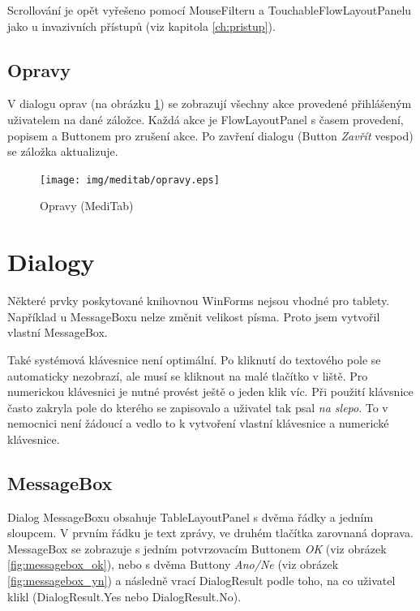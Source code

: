 Scrollování je opět vyřešeno pomocí MouseFilteru a TouchableFlowLayoutPanelu jako u invazivních přístupů (viz kapitola \ref{ch:pristup}).


\subsection{Opravy}

V dialogu oprav (na obrázku \ref{fig:opravy}) se zobrazují všechny akce provedené přihlášeným uživatelem na dané záložce. Každá akce je FlowLayoutPanel s časem provedení, popisem a Buttonem pro zrušení akce. Po zavření dialogu (Button \emph{Zavřít} vespod) se záložka aktualizuje.

\begin{figure}[H]
	\centering
	\texttt{[image: img/meditab/opravy.eps]}
	\caption{Opravy (MediTab)}
  \label{fig:opravy}
\end{figure}



\section{Dialogy}
\label{ch:dialogy}

Některé prvky poskytované knihovnou WinForms nejsou vhodné pro tablety. Například u MessageBoxu nelze změnit velikost písma. Proto jsem vytvořil vlastní MessageBox.

Také systémová klávesnice není optimální. Po kliknutí do textového pole se automaticky nezobrazí, ale musí se kliknout na malé tlačítko v liště. Pro numerickou klávesnici je nutné provést ještě o jeden klik víc. Při použití klávsnice často zakryla pole do kterého se zapisovalo a uživatel tak psal \emph{na slepo}. To v nemocnici není žádoucí a vedlo to k vytvoření vlastní klávesnice a numerické klávesnice.

\subsection{MessageBox}

Dialog MessageBoxu obsahuje TableLayoutPanel s dvěma řádky a jedním sloupcem. V prvním řádku je text zprávy, ve druhém tlačítka zarovnaná doprava. MessageBox se zobrazuje s jedním potvrzovacím Buttonem \emph{OK} (viz obrázek \ref{fig:messagebox_ok}), nebo s dvěma Buttony \emph{Ano/Ne} (viz obrázek \ref{fig:messagebox_yn}) a následně vrací DialogResult podle toho, na co uživatel klikl (DialogResult.Yes nebo DialogResult.No).

